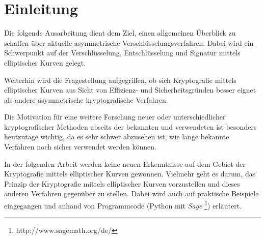\chapter{Einleitung}

Die folgende Ausarbeitung dient dem Ziel, einen allgemeinen Überblick zu schaffen über 
aktuelle asymmetrische Verschlüsselungsverfahren. Dabei wird ein Schwerpunkt auf der 
Verschlüsselung, Entschlüsselung und Signatur mittels elliptischer Kurven gelegt.

Weiterhin wird die Fragestellung aufgegriffen, ob sich Kryptografie mittels elliptischer Kurven
aus Sicht von Effizienz- und Sicherheitsgründen besser eignet als andere asymmetrische 
kryptografische Verfahren.

Die Motivation für eine weitere Forschung neuer oder unterschiedlicher kryptografischer Methoden
abseits der bekannten und verwendeten ist besonders heutzutage wichtig, da es sehr schwer
abzusehen ist, wie lange bekannte Verfahren noch sicher verwendet werden können.

In der folgenden Arbeit werden keine neuen Erkenntnisse auf dem Gebiet der Kryptografie mittels elliptischer Kurven gewonnen.
Vielmehr geht es darum, das Prinzip der Kryptografie mittels elliptischer Kurven vorzustellen und dieses anderen Verfahren gegenüber zu stellen.
Dabei wird auch auf praktische Beispiele eingegangen und anhand von Programmcode (Python mit \emph{Sage} \footnote{http://www.sagemath.org/de/}) erläutert.

